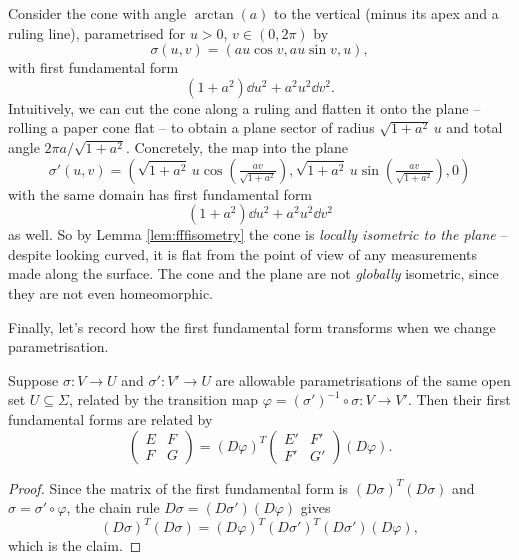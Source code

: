 \documentclass[a4paper]{scrartcl}
\begin{document}
\begin{example}\label{ex:cone}
    Consider the cone with angle $\arctan(a)$ to the vertical (minus its apex and a ruling line), parametrised for $u > 0$, $v \in (0, 2\pi)$ by
    $$
    \sigma(u, v) = (a u \cos v, au\sin v, u),
    $$
    with first fundamental form
    $$
    (1 + a^2) \dd u^2 + a^2 u^2 \dd v^2.
    $$
    Intuitively, we can cut the cone along a ruling and flatten it onto the plane -- rolling a paper cone flat -- to obtain a plane sector of radius $\sqrt{1 + a^2}\,u$ and total angle $2\pi a / \sqrt{1 + a^2}$. Concretely, the map into the plane
    $$
    \sigma'(u, v) = \left(\sqrt{1 + a^2}\, u \cos\left(\tfrac{a v}{\sqrt{1 + a^2}}\right), \sqrt{1 + a^2} \, u \sin\left(\tfrac{av}{\sqrt{1+a^2}}\right), 0\right)
    $$
    with the same domain has first fundamental form
    $$
    (1 + a^2) \dd u^2 + a^2 u^2 \dd v^2
    $$
    as well. So by Lemma \ref{lem:fffisometry} the cone is \emph{locally isometric to the plane} -- despite looking curved, it is flat from the point of view of any measurements made along the surface. The cone and the plane are not \emph{globally} isometric, since they are not even homeomorphic.
\end{example}

Finally, let's record how the first fundamental form transforms when we change parametrisation.

\begin{lemma}
    Suppose $\sigma: V \rightarrow U$ and $\sigma': V' \rightarrow U$ are allowable parametrisations of the same open set $U \subseteq \Sigma$, related by the transition map $\varphi = (\sigma')^{-1} \circ \sigma : V \rightarrow V'$. Then their first fundamental forms are related by
    $$
    \begin{pmatrix} E & F \\ F & G\end{pmatrix} = (D\varphi)^T \begin{pmatrix} E' & F' \\ F' & G' \end{pmatrix} (D\varphi).
    $$
\end{lemma}
\begin{proof}
    Since the matrix of the first fundamental form is $(D\sigma)^T(D\sigma)$ and $\sigma = \sigma' \circ \varphi$, the chain rule $D\sigma = (D\sigma')( D\varphi)$ gives
    $$
    (D\sigma)^T (D\sigma) = (D\varphi)^T (D\sigma')^T (D\sigma') (D\varphi),
    $$
    which is the claim.
\end{proof}
\end{document}

